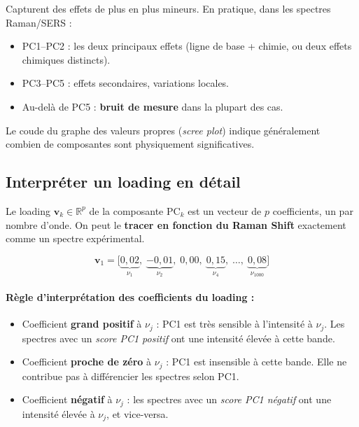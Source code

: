 \documentclass[12pt, a4paper]{article}
\newcommand{\vv}{\mathbf{v}}
\begin{document}
Capturent des effets de plus en plus mineurs. En pratique, dans les spectres
Raman/SERS :
\begin{itemize}
  \item PC1--PC2 : les deux principaux effets (ligne de base + chimie, ou deux
        effets chimiques distincts).
  \item PC3--PC5 : effets secondaires, variations locales.
  \item Au-delà de PC5 : \textbf{bruit de mesure} dans la plupart des cas.
\end{itemize}

Le \og coude\fg{} du graphe des valeurs propres (\textit{scree plot}) indique
généralement combien de composantes sont physiquement significatives.

\subsection{Interpréter un loading en détail}

Le loading $\vv_k \in \mathbb{R}^p$ de la composante PC$_k$ est un vecteur
de $p$ coefficients, un par nombre d'onde. On peut le \textbf{tracer en
fonction du Raman Shift} exactement comme un spectre expérimental.

\[
\vv_1 = \bigl[\underbrace{0{,}02}_{\nu_1},\;
              \underbrace{-0{,}01}_{\nu_2},\;
              0{,}00,\;
              \underbrace{0{,}15}_{\nu_4},\;
              \ldots,\;
              \underbrace{0{,}08}_{\nu_{1000}}\bigr]
\]

\paragraph{Règle d'interprétation des coefficients du loading :}

\begin{itemize}
  \item Coefficient \textbf{grand positif} à $\nu_j$ : PC1 est très sensible
        à l'intensité à $\nu_j$. Les spectres avec un \emph{score PC1 positif}
        ont une intensité élevée à cette bande.

  \item Coefficient \textbf{proche de zéro} à $\nu_j$ : PC1 est insensible à
        cette bande. Elle ne contribue pas à différencier les spectres selon
        PC1.

  \item Coefficient \textbf{négatif} à $\nu_j$ : les spectres avec un
        \emph{score PC1 négatif} ont une intensité élevée à $\nu_j$, et
        vice-versa.
\end{itemize}
\end{document}
